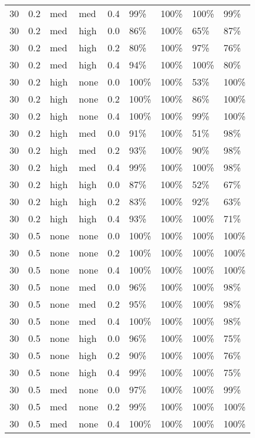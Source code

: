 \begin{longtable}{rrllrllll}
  30 & 0.2 & med & med & 0.4 & 99\% & 100\% & 100\% & 99\% \\ 
  30 & 0.2 & med & high & 0.0 & 86\% & 100\% & 65\% & 87\% \\ 
  30 & 0.2 & med & high & 0.2 & 80\% & 100\% & 97\% & 76\% \\ 
  30 & 0.2 & med & high & 0.4 & 94\% & 100\% & 100\% & 80\% \\ 
  30 & 0.2 & high & none & 0.0 & 100\% & 100\% & 53\% & 100\% \\ 
  30 & 0.2 & high & none & 0.2 & 100\% & 100\% & 86\% & 100\% \\ 
  30 & 0.2 & high & none & 0.4 & 100\% & 100\% & 99\% & 100\% \\ 
  30 & 0.2 & high & med & 0.0 & 91\% & 100\% & 51\% & 98\% \\ 
  30 & 0.2 & high & med & 0.2 & 93\% & 100\% & 90\% & 98\% \\ 
  30 & 0.2 & high & med & 0.4 & 99\% & 100\% & 100\% & 98\% \\ 
  30 & 0.2 & high & high & 0.0 & 87\% & 100\% & 52\% & 67\% \\ 
  30 & 0.2 & high & high & 0.2 & 83\% & 100\% & 92\% & 63\% \\ 
  30 & 0.2 & high & high & 0.4 & 93\% & 100\% & 100\% & 71\% \\ 
  30 & 0.5 & none & none & 0.0 & 100\% & 100\% & 100\% & 100\% \\ 
  30 & 0.5 & none & none & 0.2 & 100\% & 100\% & 100\% & 100\% \\ 
  30 & 0.5 & none & none & 0.4 & 100\% & 100\% & 100\% & 100\% \\ 
  30 & 0.5 & none & med & 0.0 & 96\% & 100\% & 100\% & 98\% \\ 
  30 & 0.5 & none & med & 0.2 & 95\% & 100\% & 100\% & 98\% \\ 
  30 & 0.5 & none & med & 0.4 & 100\% & 100\% & 100\% & 98\% \\ 
  30 & 0.5 & none & high & 0.0 & 96\% & 100\% & 100\% & 75\% \\ 
  30 & 0.5 & none & high & 0.2 & 90\% & 100\% & 100\% & 76\% \\ 
  30 & 0.5 & none & high & 0.4 & 99\% & 100\% & 100\% & 75\% \\ 
  30 & 0.5 & med & none & 0.0 & 97\% & 100\% & 100\% & 99\% \\ 
  30 & 0.5 & med & none & 0.2 & 99\% & 100\% & 100\% & 100\% \\ 
  30 & 0.5 & med & none & 0.4 & 100\% & 100\% & 100\% & 100\% \\ 

\end{longtable}
